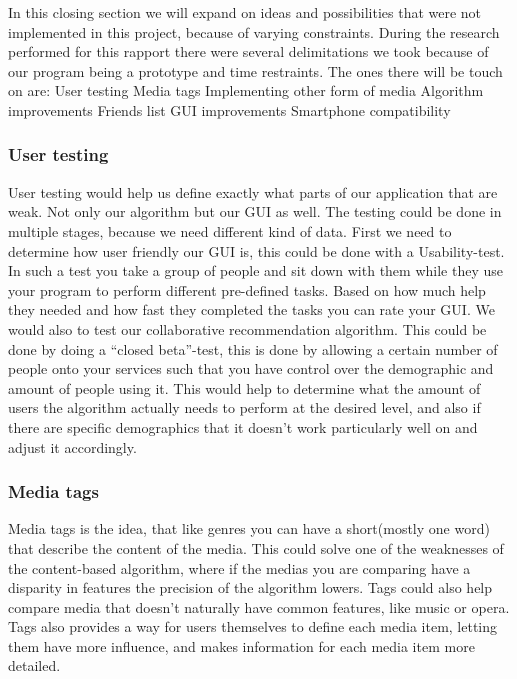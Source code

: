 In this closing section we will expand on ideas and possibilities that were not implemented in this project, because of varying constraints. During the research performed for this rapport there were several delimitations we took because of our program being a prototype and time restraints. The ones there will be touch on are:
User testing
Media tags
Implementing other form of media
Algorithm improvements
Friends list
GUI improvements
Smartphone compatibility 

\subsubsection{User testing}
User testing would help us define exactly what parts of our application that are weak. Not only our algorithm but our GUI as well. The testing could be done in multiple stages, because we need different kind of data. First we need to determine how user friendly our GUI is, this could be done with a Usability-test. In such a test you take a group of people and sit down with them while they use your program to perform different pre-defined tasks. Based on how much help they needed and how fast they completed the tasks you can rate your GUI. We would also to test our collaborative recommendation algorithm. This could be done by doing a “closed beta”-test, this is done by allowing a certain number of people onto your services such that you have control over the demographic and amount of people using it. This would help to determine what the amount of users the algorithm actually needs to perform at the desired level, and also if there are specific demographics that it doesn't work particularly well on and adjust it accordingly.

\subsubsection{Media tags}\label{futureWork:Tags}
Media tags is the idea, that like genres you can have a short(mostly one word) that describe the content of the media. This could solve one of the weaknesses of the content-based algorithm, where if the medias you are comparing have a disparity in features the precision of the algorithm lowers. Tags could also help compare media that doesn't naturally have common features, like music or opera. Tags also provides a way for users themselves to define each media item, letting them have more influence, and makes information for each media item more detailed.

